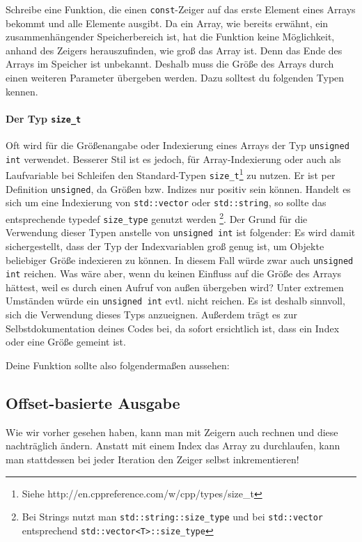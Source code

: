 Schreibe eine Funktion, die einen \lstinline{const}-Zeiger auf das erste Element eines Arrays bekommt und alle Elemente ausgibt.
Da ein Array, wie bereits erwähnt, ein zusammenhängender Speicherbereich ist, hat die Funktion keine Möglichkeit, anhand des Zeigers herauszufinden, wie groß das Array ist. 
Denn das Ende des Arrays im Speicher ist unbekannt. 
Deshalb muss die Größe des Arrays durch einen weiteren Parameter übergeben werden. Dazu solltest du folgenden Typen kennen.

\paragraph{Der Typ \lstinline$size_t$}
Oft wird für die Größenangabe oder Indexierung eines Arrays der Typ \lstinline{unsigned int} verwendet. 
Besserer Stil ist es jedoch, für Array-Indexierung oder auch als Laufvariable bei Schleifen den Standard-Typen \lstinline$size_t$\footnote{Siehe http://en.cppreference.com/w/cpp/types/size\_t} zu nutzen.
Er ist per Definition \lstinline$unsigned$, da Größen bzw. Indizes nur positiv sein können.
Handelt es sich um eine Indexierung von \lstinline{std::vector} oder \lstinline{std::string}, so sollte das entsprechende typedef \lstinline{size_type} genutzt werden
\footnote{Bei Strings nutzt man \lstinline$std::string::size_type$ und bei \lstinline{std::vector} entsprechend \lstinline{std::vector<T>::size_type}}.
Der Grund für die Verwendung dieser Typen anstelle von \lstinline{unsigned int} ist folgender: 
Es wird damit sichergestellt, dass der Typ der Indexvariablen groß genug ist, um Objekte beliebiger Größe indexieren zu können.
In diesem Fall würde zwar auch \lstinline{unsigned int} reichen. 
Was wäre aber, wenn du keinen Einfluss auf die Größe des Arrays hättest, weil es durch einen Aufruf von außen übergeben wird?
Unter extremen Umständen würde ein \lstinline{unsigned int} evtl. nicht reichen.
Es ist deshalb sinnvoll, sich die Verwendung dieses Typs anzueignen.
Außerdem trägt es zur Selbstdokumentation deines Codes bei, da sofort ersichtlich ist, dass ein Index oder eine Größe gemeint ist.

Deine Funktion sollte also folgendermaßen aussehen:



\subsection{Offset-basierte Ausgabe}
Wie wir vorher gesehen haben, kann man mit Zeigern auch rechnen und diese nachträglich ändern.
Anstatt mit einem Index das Array zu durchlaufen, kann man stattdessen bei jeder Iteration den Zeiger selbst inkrementieren!

